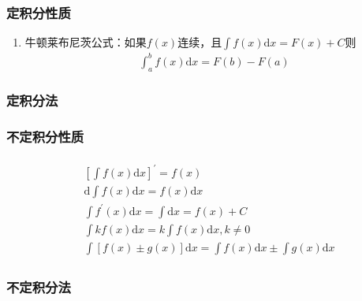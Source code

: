 \documentclass[12pt]{book}
\begin{document}
\subsubsection{定积分性质}



\begin{enumerate}[1.]
    \item 牛顿莱布尼茨公式：如果$f(x)$连续，且$\int{f(x)\mathrm{d}x} = F(x)+C$则
          \begin{gather*}
              \int_{a}^{b}{f(x)\mathrm{d}x}=F(b)-F(a)
          \end{gather*}
\end{enumerate}





\subsubsection{定积分法}







\subsubsection{不定积分性质}



\begin{gather*}
    \begin{aligned}
        & [\int f(x) \mathrm{d}x]^\prime = f(x)  \\
        & \mathrm{d} \int f(x) \mathrm{d}x = f(x) \mathrm{d}x \\
        & \int{ f^\prime(x) \mathrm{d}x } = \int{\mathrm{d}x} = f(x) +C \\
        & \int{ kf(x) \mathrm{d}x} = k \int{f(x)\mathrm{d}x}, k\neq 0 \\
        & \int{[f(x)\pm g(x)] \mathrm{d}x} = \int{f(x)\mathrm{d}x}\pm\int{g(x)\mathrm{d}x} 
    \end{aligned}
\end{gather*}



\subsubsection{不定积分法}
\end{document}
